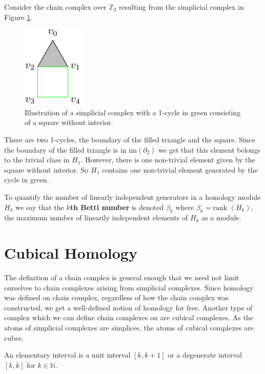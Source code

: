 \begin{example}
Consider the chain complex over $\mathbb{Z}_{2}$ resulting from the simplicial complex in Figure \ref{trihom}.
\begin{figure}[ht]
  \centering
  \includegraphics[scale=2]{trisquarefilled.pdf}
  \caption{\label{trihom} Illustration of a simplicial complex with a 1-cycle in green consisting of a square without interior.}
\end{figure}
There are two 1-cycles, the boundary of the filled triangle and the square. Since the boundary of the filled triangle is in $\text{im} (\partial_{2})$ we get that this element belongs to the trivial class in $H_{1}$. However, there is one non-trivial element given by the square without interior. So $H_{1}$ contains one non-trivial element generated by the cycle in green.

To quantify the number of linearly independent generators in a homology module $H_{k}$ we say that the \textbf{$k$th Betti number} is denoted $\beta_{k}$ where $\beta_{k} = \text{rank }(H_{k})$, the maximum number of linearily independent elements of $H_{k}$ as a module.

\section{Cubical Homology}
The definition of a chain complex is general enough that we need not limit ourselves to chain complexes arising from simplicial complexes. Since homology was defined on chain complex, regardless of how the chain complex was constructed, we get a well-defined notion of homology for free. Another type of complex which we can define chain complexes on are cubical complexes. As the atoms of simplicial complexes are simplices, the atoms of cubical complexes are cubes.

\begin{definition}
An elementary interval is a unit interval $[k,k+1]$ or a degenerate interval $[k,k]$ for $k \in \mathbb{N}$.
\end{definition}


\end{example}
